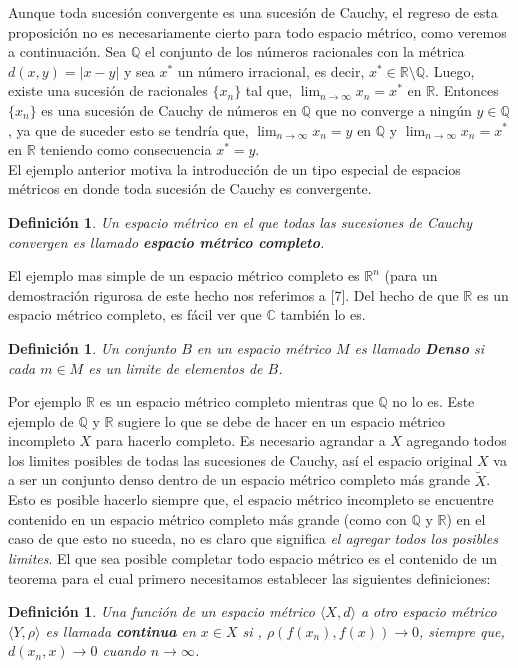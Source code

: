 \documentclass[12pt]{book}
\numberwithin{equation}{chapter}
\newtheorem{definition}[theorem]{Definici\'on}
\def\R{\mathbb{R}}
\def\C{\mathbb{C}}
\def\la{\langle}
\def\ra{\rangle}
\def\rar{\rightarrow}
\def\r{\rho}
\begin{document}
\vspace{5 mm}

Aunque toda sucesi\'on convergente es una sucesi\'on de Cauchy, el regreso de esta proposici\'on no es necesariamente cierto para todo espacio m\'etrico, como veremos a continuaci\'on. Sea $\mathbb{Q}$ el conjunto de los n\'umeros racionales con la m\'etrica $d(x,y)= |x-y|$ y sea $x^{*}$ un n\'umero irracional, es decir, $x^{*} \in \R \setminus \mathbb{Q}$. Luego, existe una sucesi\'on de racionales $\{x_{n}\}$ tal que, $\lim_{n \rar \infty} x_{n}= x^{*}$ en $\R$. Entonces $\{x_{n}\}$ es una sucesi\'on de Cauchy de n\'umeros en $\mathbb{Q}$ que no converge a ning\'un $y \in \mathbb{Q}$, ya que de suceder esto se tendr\'ia que, $\lim_{n \rar \infty} x_{n}= y$ en $\mathbb{Q}$ y $\lim_{n \rar \infty} x_{n}= x^{*}$ en $\R$ teniendo como consecuencia $x^{*}=y$.\\
El ejemplo anterior motiva la introducci\'on de un tipo especial de espacios m\'etricos en donde toda sucesi\'on de Cauchy es convergente.
\begin{definition}
Un espacio m\'etrico en el que todas las sucesiones de Cauchy convergen es llamado {\bf espacio m\'etrico completo}.
\end{definition}

El ejemplo mas simple de un espacio m\'etrico completo es $\R^{n}$ (para un demostraci\'on rigurosa de este hecho nos referimos a [7]. Del hecho de que $\R$ es un espacio m\'etrico completo, es f\'acil ver que $\C$ tambi\'en lo es.

\begin{definition}
Un conjunto $B$ en un espacio m\'etrico $M$ es llamado {\bf Denso} si cada $m \in M$ es un limite de elementos de $B$. 
\end{definition}
 Por ejemplo $\R$ es un espacio m\'etrico completo mientras que $\mathbb{Q}$ no lo es. Este ejemplo de $\mathbb{Q}$ y $\R$ sugiere lo que se debe de hacer en un espacio m\'etrico incompleto $X$ para hacerlo completo. Es necesario agrandar a $X$ agregando todos los limites posibles de todas las sucesiones de Cauchy, as\'i el espacio original $X$ va a ser un conjunto denso dentro de un espacio m\'etrico completo m\'as grande $\tilde{X}$. Esto es posible hacerlo siempre que, el espacio m\'etrico incompleto se encuentre contenido en un espacio m\'etrico completo m\'as grande (como con $\mathbb{Q}$ y $\R$) en el caso de que esto no suceda, no es claro que significa \emph{el agregar todos los posibles limites}. El que sea posible completar todo espacio m\'etrico es el contenido de un teorema para el cual primero necesitamos establecer las siguientes definiciones:
\begin{definition}
Una funci\'on de un espacio m\'etrico $ \la X , d \ra $ a otro espacio m\'etrico $\la Y , \r \ra$ es llamada {\bf continua} en $x \in X$ si , $\r (f(x_{n}),f(x)) \rar 0$, siempre que, $ d(x_{n},x) \rar 0 $ cuando $n \rar \infty$.
\end{definition}
\end{document}
